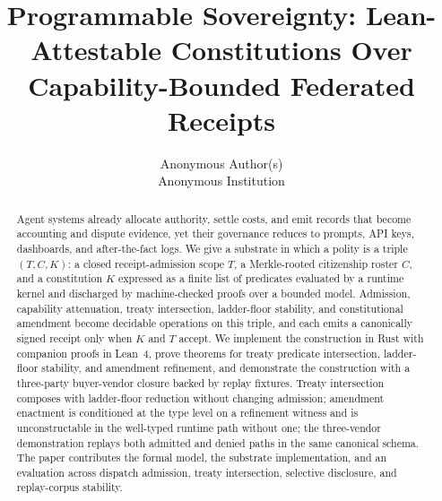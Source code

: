 \documentclass[letterpaper,twocolumn,10pt]{article}
\date{}
\title{\Large \bf Programmable Sovereignty: Lean-Attestable Constitutions Over Capability-Bounded Federated Receipts}
\author{
{\rm Anonymous Author(s)}\\
Anonymous Institution
}
\begin{document}
\maketitle

\begin{abstract}
Agent systems already allocate authority, settle costs, and emit records that become accounting and dispute evidence, yet their governance reduces to prompts, API keys, dashboards, and after-the-fact logs. We give a substrate in which a polity is a triple $(T, C, K)$: a closed receipt-admission scope $T$, a Merkle-rooted citizenship roster $C$, and a constitution $K$ expressed as a finite list of predicates evaluated by a runtime kernel and discharged by machine-checked proofs over a bounded model. Admission, capability attenuation, treaty intersection, ladder-floor stability, and constitutional amendment become decidable operations on this triple, and each emits a canonically signed receipt only when $K$ and $T$ accept. We implement the construction in Rust with companion proofs in Lean~4, prove theorems for treaty predicate intersection, ladder-floor stability, and amendment refinement, and demonstrate the construction with a three-party buyer-vendor closure backed by replay fixtures. Treaty intersection composes with ladder-floor reduction without changing admission; amendment enactment is conditioned at the type level on a refinement witness and is unconstructable in the well-typed runtime path without one; the three-vendor demonstration replays both admitted and denied paths in the same canonical schema. The paper contributes the formal model, the substrate implementation, and an evaluation across dispatch admission, treaty intersection, selective disclosure, and replay-corpus stability.
\end{abstract}














\end{document}
